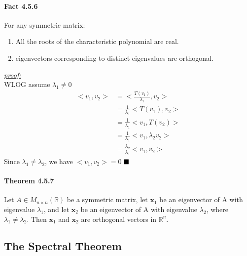 \documentclass[11pt]{article}
\newcommand{\tb}[1]{\textbf{#1}}
\newcommand{\proof}[0]{\textit{\underline{proof:} }}
\newcommand{\qed}[0]{$\hfill\blacksquare$}
\newcommand{\real}[0]{\mathbb{R}}
\newcommand{\vx}[0]{\tb{x}}
\begin{document}
{\paragraph{Fact 4.5.6} For any symmetric matrix:
\begin{enumerate}
	\item All the roots of the characteristic polynomial are real.
	\item eigenvectors corresponding to distinct eigenvalues are orthogonal.
\end{enumerate}
\proof \\
WLOG assume $\lambda_1 \neq 0$
\begin{align*}
	<v_1,v_2> &= <\frac{T(v_1)}{\lambda_1},v_2> \\
	&= \frac{1}{\lambda_1}<T(v_1),v_2> \\
	&= \frac{1}{\lambda_1}<v_1,T(v_2)> \\
	&= \frac{1}{\lambda_1}<v_1,\lambda_2v_2> \\
	&= \frac{\lambda_2}{\lambda_1}<v_1,v_2>  
\end{align*}
Since $\lambda_1 \neq \lambda_2$, we have $<v_1,v_2> = 0$
\qed
\paragraph{Theorem 4.5.7} Let $A \in M_{n\times n}(\real)$ be a symmetric matrix, let $\vx_1$ be an eigenvector of A with eigenvalue $\lambda_1$, and let $\vx_2$ be an eigenvector of A with eigenvalue $\lambda_2$, where $\lambda_1 \neq \lambda_2$. Then $\vx_1$ and $\vx_2$ are orthogonal vectors in $\real^n$. 
\subsection{The Spectral Theorem}
}
\end{document}
